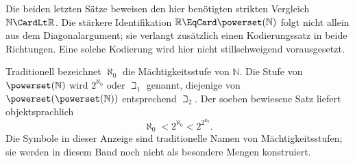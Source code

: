 \documentclass[main.tex]{subfiles}
\begin{document}
\begin{tabproofwide}
\end{tabproofwide}

\begin{remark}
Die beiden letzten Sätze beweisen den hier benötigten strikten Vergleich
\(\mathbb N\CardLt\mathbb R\). Die stärkere Identifikation
\(\mathbb R\EqCard\powerset(\mathbb N)\) folgt nicht allein aus dem
Diagonalargument; sie verlangt zusätzlich einen Kodierungssatz in beide
Richtungen. Eine solche Kodierung wird hier nicht stillschweigend
vorausgesetzt.
\end{remark}

\begin{tabproof}
\end{tabproof}

\begin{tabproof}
\end{tabproof}

\begin{remark}
Traditionell bezeichnet \(\aleph_0\) die Mächtigkeitsstufe von
\(\mathbb N\). Die Stufe von \(\powerset(\mathbb N)\) wird
\(2^{\aleph_0}\) oder \(\beth_1\) genannt, diejenige von
\(\powerset(\powerset(\mathbb N))\) entsprechend \(\beth_2\).
Der soeben bewiesene Satz liefert objektsprachlich
\[
  \aleph_0<2^{\aleph_0}<2^{2^{\aleph_0}}.
\]
Die Symbole in dieser Anzeige sind traditionelle Namen von
Mächtigkeitsstufen; sie werden in diesem Band noch nicht als besondere
Mengen konstruiert.
\end{remark}
\end{document}
